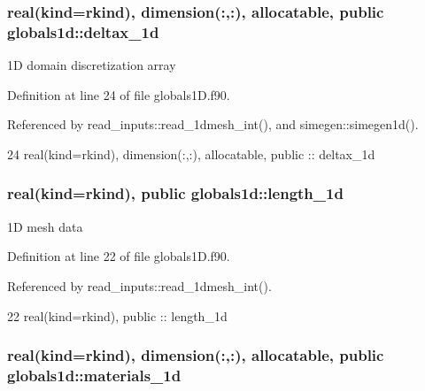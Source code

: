 \subsubsection[{deltax\+\_\+1d}]{\setlength{\rightskip}{0pt plus 5cm}real(kind=rkind), dimension(\+:,\+:), allocatable, public globals1d\+::deltax\+\_\+1d}\label{namespaceglobals1d_ab7a30956e6923e6be127aeddf356fa27}


1D domain discretization array 



Definition at line 24 of file globals1\+D.\+f90.



Referenced by read\+\_\+inputs\+::read\+\_\+1dmesh\+\_\+int(), and simegen\+::simegen1d().


\begin{DoxyCode}
24   \textcolor{keywordtype}{real(kind=rkind)}, \textcolor{keywordtype}{dimension(:,:)}, \textcolor{keywordtype}{allocatable},  \textcolor{keywordtype}{public} :: deltax\_1d
\end{DoxyCode}
\subsubsection[{length\+\_\+1d}]{\setlength{\rightskip}{0pt plus 5cm}real(kind=rkind), public globals1d\+::length\+\_\+1d}\label{namespaceglobals1d_aa1804fbc2a8cf0ae95010fe1bc620f7f}


1D mesh data 



Definition at line 22 of file globals1\+D.\+f90.



Referenced by read\+\_\+inputs\+::read\+\_\+1dmesh\+\_\+int().


\begin{DoxyCode}
22   \textcolor{keywordtype}{real(kind=rkind)}, \textcolor{keywordtype}{public} ::   length\_1d
\end{DoxyCode}
\subsubsection[{materials\+\_\+1d}]{\setlength{\rightskip}{0pt plus 5cm}real(kind=rkind), dimension(\+:,\+:), allocatable, public globals1d\+::materials\+\_\+1d}\label{namespaceglobals1d_a63eb12680491b38e60b92fb7ba1ec3ec}


